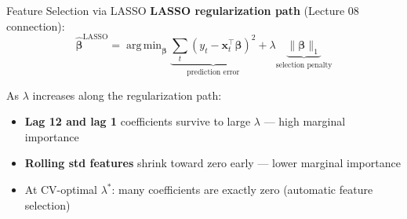 \documentclass[aspectratio=169, 10pt]{beamer}
\begin{document}
\begin{frame}{Feature Selection via LASSO}
  \textbf{LASSO regularization path} (Lecture 08 connection):
  \[
    \hat{\boldsymbol{\beta}}^{\text{LASSO}}
      = \operatorname{arg\,min}_{\boldsymbol{\beta}}
        \underbrace{\sum_{t} (y_t - \mathbf{x}_t^\top \boldsymbol{\beta})^2}_{\text{prediction error}}
        + \lambda \underbrace{\|\boldsymbol{\beta}\|_1}_{\text{selection penalty}}
  \]

  \medskip
  As $\lambda$ increases along the regularization path:
  \begin{itemize}
    \item \textbf{Lag 12 and lag 1} coefficients survive to large $\lambda$ ---
          high marginal importance
    \item \textbf{Rolling std features} shrink toward zero early ---
          lower marginal importance
    \item At CV-optimal $\lambda^*$: many coefficients are exactly zero
          (automatic feature selection) \parencite{Tibshirani1996}
  \end{itemize}

  \medskip
\end{frame}
\end{document}

